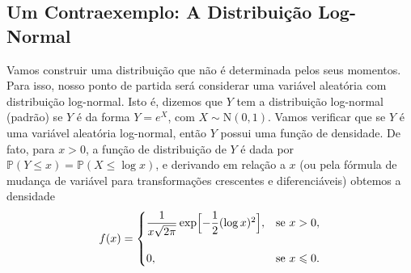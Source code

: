 \documentclass[12pt,portuguese]{article}
\theoremstyle{definition}
\theoremstyle{plainexercise}
\theoremstyle{starredexercise}
\theoremstyle{definition}
\begin{document}
\subsection{Um Contraexemplo: A Distribuição Log-Normal}\label{subsec:lognormal}

Vamos construir uma distribuição que não é determinada pelos seus momentos. Para
isso, nosso ponto de partida será considerar uma variável aleatória
com distribuição log-normal. Isto é, dizemos que $Y$ tem a distribuição log-normal (padrão)
se $Y$ é da forma $Y = e^X$, com $X \sim \mathrm{N}(0,1)$.
Vamos verificar que se $Y$ é uma variável aleatória log-normal, então $Y$ possui uma função de densidade.
De fato, para $x > 0$, a função de distribuição de $Y$ 
é dada por $\mathbb{P}(Y \leqslant x) = \mathbb{P}(X \leqslant
\log x)$, e derivando em relação a $x$ (ou pela fórmula de mudança de variável
para transformações crescentes e diferenciáveis) obtemos a densidade
\begin{equation}\label{eq:densidade-lognormal}
  f(x) =
  \begin{cases}
    \dfrac{1}{x\sqrt{2\pi}} \exp\Bigl[-\dfrac{1}{2}(\log x)^2\Bigr],
      & \text{se } x > 0,
    \\[0.6cm]
    0, & \text{se } x \leqslant 0.
  \end{cases}
\end{equation}
\end{document}
